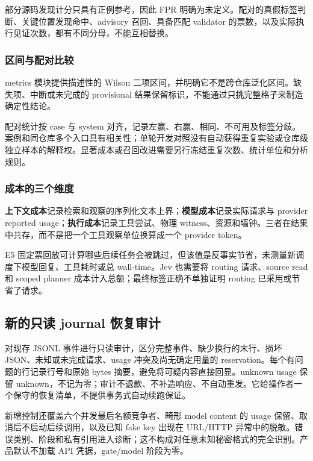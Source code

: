 部分源码发现计分只具有正例参考，因此 FPR 明确为未定义。配对的真假标签判断、关键位置发现命中、advisory 召回、具备匹配 validator 的票数，以及实际执行见证次数，都有不同分母，不能互相替换。

\subsubsection{区间与配对比较}
metrics 模块提供描述性的 Wilson 二项区间，并明确它不是跨仓库泛化区间。缺失项、中断或未完成的 provisional 结果保留标识，不能通过只挑完整格子来制造确定性结论。

配对统计按 case 与 system 对齐，记录左赢、右赢、相同、不可用及标签分歧。案例和同仓库多个入口具有相关性；单轮开发对照没有自动获得重复实验或仓库级独立样本的解释权。显著成本或召回改进需要另行冻结重复次数、统计单位和分析规则。

\subsubsection{成本的三个维度}
\textbf{上下文成本}记录检索和观察的序列化文本上界；\textbf{模型成本}记录实际请求与 provider reported usage；\textbf{执行成本}记录工具尝试、物理 witness、资源和墙钟。三者在结果中共存，而不是把一个工具观察单位换算成一个 provider token。

E5 固定票回放可计算哪些后续任务会被跳过，但该值是反事实节省，未测量新调度下模型回复、工具耗时或总 wall-time。Jev 也需要将 routing 请求、source read 和 scoped planner 成本计入总额；最终标签正确不单独证明 routing 已采用或节省了请求。


\subsection{新的只读 journal 恢复审计}
 对现存 JSONL 事件进行只读审计，区分完整事件、缺少换行的末行、损坏 JSON、未知或未完成请求、usage 冲突及尚无确定用量的 reservation。每个有问题的行记录行号和原始 bytes 摘要，避免将可疑内容直接回显。unknown usage 保留 unknown，不记为零；审计不退款、不补造响应、不自动重发。它给操作者一个保守的恢复清单，不提供事务式自动续跑保证。

新增控制还覆盖六个并发最后名额竞争者、畸形 model content 的 usage 保留、取消后不启动后续调用，以及已知 fake key 出现在 URL/HTTP 异常中的脱敏。错误类别、阶段和私有引用进入诊断；这不构成对任意未知秘密格式的完全识别。产品默认不加载 API 凭据，gate/model 阶段为零。\citep{acceptance}
